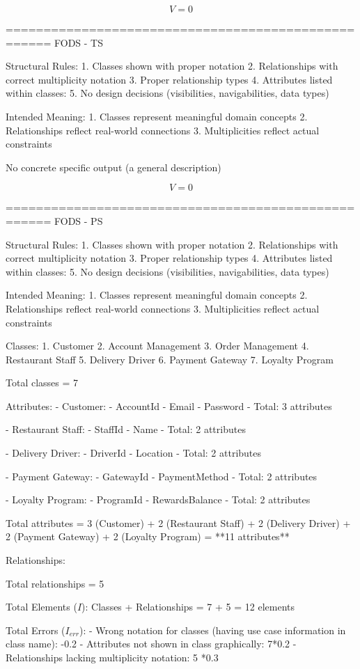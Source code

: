 \[
V = 0
\]

====================================================
FODS - TS

Structural Rules:
1. Classes shown with proper notation
2. Relationships with correct multiplicity notation
3. Proper relationship types
4. Attributes listed within classes: 
5. No design decisions (visibilities, navigabilities, data types)

Intended Meaning:
1. Classes represent meaningful domain concepts
2. Relationships reflect real-world connections
3. Multiplicities reflect actual constraints

No concrete specific  output (a general description) 

\[
V = 0
\]

====================================================
FODS - PS

Structural Rules:
1. Classes shown with proper notation
2. Relationships with correct multiplicity notation
3. Proper relationship types
4. Attributes listed within classes: 
5. No design decisions (visibilities, navigabilities, data types)

Intended Meaning:
1. Classes represent meaningful domain concepts
2. Relationships reflect real-world connections
3. Multiplicities reflect actual constraints

Classes:
1. Customer
2. Account Management
3. Order Management
4. Restaurant Staff
5. Delivery Driver
6. Payment Gateway
7. Loyalty Program

Total classes = 7

Attributes:
- Customer:
- AccountId
- Email
- Password
- Total: 3 attributes

- Restaurant Staff:
- StaffId
- Name
- Total: 2 attributes

- Delivery Driver:
- DriverId
- Location
- Total: 2 attributes

- Payment Gateway:
- GatewayId
- PaymentMethod
- Total: 2 attributes

- Loyalty Program:
- ProgramId
- RewardsBalance
- Total: 2 attributes

Total attributes = 3 (Customer) + 2 (Restaurant Staff) + 2 (Delivery Driver) + 2 (Payment Gateway) + 2 (Loyalty Program) = **11 attributes**

Relationships:

Total relationships = 5

Total Elements (\( I \)):
Classes + Relationships = 7 + 5 = 12 elements

Total Errors (\( I_{err} \)):
- Wrong notation for classes (having use case information in class name): -0.2
- Attributes not shown in class graphically: 7*0.2
- Relationships lacking multiplicity notation: 5 *0.3

